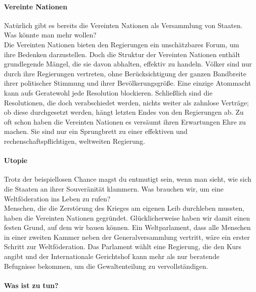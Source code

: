 \documentclass[11pt,a4paper]{article}
\begin{document}
\begin{multicols}{2}
\paragraph{Vereinte Nationen}

Natürlich gibt es bereits die Vereinten Nationen als Versammlung von Staaten. Was könnte man mehr wollen?\\
\noindent Die Vereinten Nationen bieten den Regierungen ein unschätzbares Forum, um ihre Bedenken darzustellen.
Doch die Struktur der Vereinten Nationen enthält grundlegende Mängel, die sie davon abhalten, effektiv zu handeln.
Völker sind nur durch ihre Regierungen vertreten, ohne Berücksichtigung der ganzen Bandbreite ihrer politischer Stimmung und ihrer Bevölkerungsgröße.
Eine einzige Atommacht kann aufs Geratewohl jede  Resolution blockieren.
Schließlich sind die Resolutionen, die doch verabschiedet werden, nichts weiter als zahnlose Verträge; ob diese durchgesetzt werden, hängt letzten Endes von den Regierungen ab.
Zu oft schon haben die Vereinten Nationen es versäumt ihren Erwartungen Ehre zu machen.
Sie sind nur ein Sprungbrett zu einer effektiven und rechenschaftspflichtigen, weltweiten Regierung.


\paragraph{Utopie}

Trotz der beispiellosen Chance magst du entmutigt sein, wenn man sieht, wie sich die Staaten an ihrer Souveränität klammern. Was brauchen wir, um eine Weltföderation ins Leben zu rufen?\\
\noindent Menschen, die die Zerstörung des Krieges am eigenen Leib durchleben mussten, haben die Vereinten Nationen gegründet. Glücklicherweise haben wir damit einen festen Grund, auf dem wir bauen können.
Ein Weltparlament, dass alle Menschen in einer zweiten Kammer neben der Generalversammlung vertritt, wäre ein erster Schritt zur Weltföderation.
Das Parlament wählt eine Regierung, die den Kurs angibt und der Internationale Gerichtshof kann mehr als nur beratende Befugnisse bekommen, um die Gewaltenteilung zu vervollständigen.

\end{multicols}

\paragraph{Was ist zu tun?}
\end{document}

